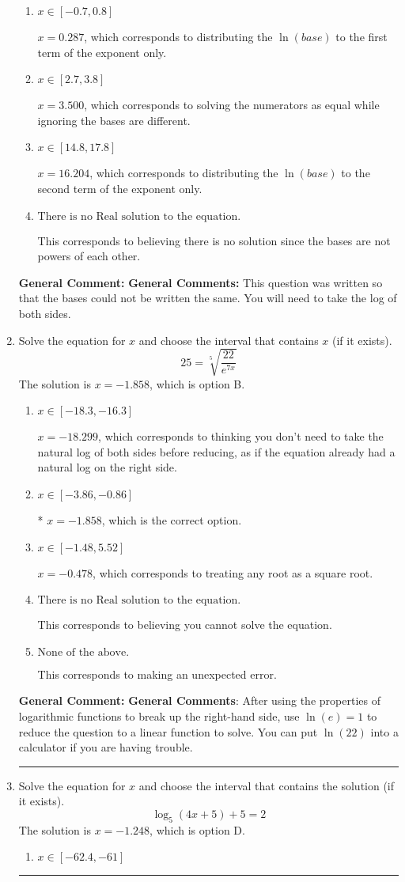 \documentclass{extbook}[14pt]
\newcommand{\litem}[1]{\item #1

\rule{\textwidth}{0.4pt}}
\begin{document}
\begin{enumerate}
{\begin{enumerate}[label=\Alph*.]
* $x = 1.330$, which is the correct option.
\item \( x \in [-0.7, 0.8] \)

$x = 0.287$, which corresponds to distributing the $\ln(base)$ to the first term of the exponent only.
\item \( x \in [2.7, 3.8] \)

$x = 3.500$, which corresponds to solving the numerators as equal while ignoring the bases are different.
\item \( x \in [14.8, 17.8] \)

$x = 16.204$, which corresponds to distributing the $\ln(base)$ to the second term of the exponent only.
\item \( \text{There is no Real solution to the equation.} \)

This corresponds to believing there is no solution since the bases are not powers of each other.
\end{enumerate}

\textbf{General Comment:} \textbf{General Comments:} This question was written so that the bases could not be written the same. You will need to take the log of both sides.
}
\litem{
 Solve the equation for $x$ and choose the interval that contains $x$ (if it exists).
\[  25 = \sqrt[5]{\frac{22}{e^{7x}}} \]The solution is \( x = -1.858 \), which is option B.\begin{enumerate}[label=\Alph*.]
\item \( x \in [-18.3, -16.3] \)

$x = -18.299$, which corresponds to thinking you don't need to take the natural log of both sides before reducing, as if the equation already had a natural log on the right side.
\item \( x \in [-3.86, -0.86] \)

* $x = -1.858$, which is the correct option.
\item \( x \in [-1.48, 5.52] \)

$x = -0.478$, which corresponds to treating any root as a square root.
\item \( \text{There is no Real solution to the equation.} \)

This corresponds to believing you cannot solve the equation.
\item \( \text{None of the above.} \)

This corresponds to making an unexpected error.
\end{enumerate}

\textbf{General Comment:} \textbf{General Comments}: After using the properties of logarithmic functions to break up the right-hand side, use $\ln(e) = 1$ to reduce the question to a linear function to solve. You can put $\ln(22)$ into a calculator if you are having trouble.
}
\litem{
Solve the equation for $x$ and choose the interval that contains the solution (if it exists).
\[ \log_{5}{(4x+5)}+5 = 2 \]The solution is \( x = -1.248 \), which is option D.\begin{enumerate}[label=\Alph*.]
\item \( x \in [-62.4, -61] \)


\end{enumerate}}
\end{enumerate}
\end{document}
